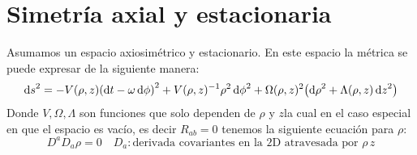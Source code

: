 \documentclass[../Main.tex]{subfiles}
\begin{document}
\renewcommand{\thesection}{A\arabic{section}}
\renewcommand{\thetable}{A\arabic{section}.\arabic{table}}




\section{Simetría axial y estacionaria}

Asumamos un espacio axiosimétrico y estacionario. En este espacio la métrica se puede expresar de la siguiente manera:
%
\begin{equation}
\dd{s}^{2} = -V(\rho, z)\qty(\dd{t}-\omega\dd{\phi})^{2}+V(\rho, z)^{-1}\rho^{2}\dd{\phi}^{2}+\Omega(\rho, z)^{2}\qty(\dd{\rho}^{2}+\Lambda(\rho, z)\dd{z}^{2})
\end{equation}
%
Donde $V,\Omega, \Lambda$ son funciones que solo dependen de $\rho$ y $z$la cual en el caso especial en que el espacio es vacío, es decir $R_{ab}=0$ tenemos la siguiente ecuación para $\rho$:
%
\begin{equation}
    D^{a}D_{a}\rho=0 \quad D_{a}: \text{derivada covariantes en la 2D atravesada por } \rho \, z
\end{equation}
%


\biblio %
\end{document}
